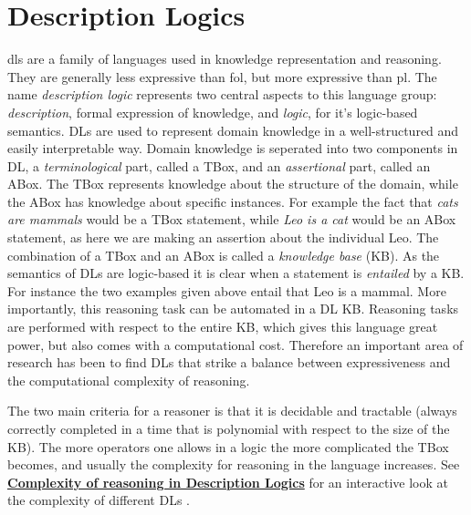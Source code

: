 \section{Description Logics}
\gls{dls} are a family of languages used in knowledge representation and reasoning. They are generally less expressive than \gls{fol}, but more expressive than \gls{pl}. The name \textit{description logic} represents two central aspects to this language group: \emph{description}, formal expression of knowledge, and  \emph{logic}, for it's logic-based semantics. DLs are used to represent domain knowledge in a well-structured and easily interpretable way. Domain knowledge is seperated into two components in DL, a \emph{terminological} part, called a TBox, and an \emph{assertional} part, called an ABox. The TBox represents knowledge about the structure of the domain, while the ABox has knowledge about specific instances. For example the fact that \emph{cats are  mammals} would be a TBox statement, while \emph{Leo is a cat} would be an ABox statement, as here we are making an assertion about the individual Leo. The combination of a TBox and an ABox is called a \emph{knowledge base} (KB).
As the semantics of DLs are logic-based it is clear when a statement is \emph{entailed} by a KB. For instance the two examples given above entail that Leo is a mammal. More importantly, this reasoning task can be automated in a DL KB. Reasoning tasks are performed with respect to the entire KB, which gives this language great power, but also comes with a computational cost. Therefore an important area of research has been to find DLs that strike a balance between expressiveness and the computational complexity of reasoning.


The two main criteria for a reasoner is that it is decidable and tractable (always correctly completed in a time that is polynomial with respect to the size of the KB). The more operators one allows in a logic the more complicated the TBox becomes, and usually the complexity for reasoning in the language increases. See \href{http://www.cs.man.ac.uk/~ezolin/dl/}{\textbf{Complexity of reasoning in Description Logics}} for an interactive look at the complexity of different DLs \cite{zolin_2013}.